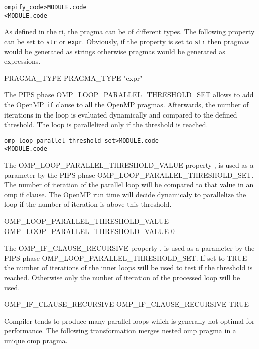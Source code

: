 \documentclass[a4paper]{report}
\newenvironment{PipsMake}{\begin{alltt}}{\end{alltt}}
\newenvironment{PipsPass}[1]{\label{pass:#1}}{}
\begin{document}
\begin{PipsMake}
ompify_code             > MODULE.code
        < MODULE.code

\end{PipsMake}

As defined in the ri, the pragma can be of different types. The following
property can be set to \verb|str| or \verb|expr|. Obviously, if the
property is set to \verb|str| then pragmas would be generated as strings
otherwise pragmas would be generated as expressions.
\begin{PipsProp}{PRAGMA_TYPE}
PRAGMA_TYPE "expr"
\end{PipsProp}

\begin{PipsPass}{omp_loop_parallel_threshold_set}
The PIPS phase  OMP\_LOOP\_PARALLEL\_THRESHOLD\_SET allows to add the OpenMP
\verb|if| clause to all the OpenMP pragmas. Afterwards, the number of iterations
in the loop is evaluated dynamically and compared to the defined threshold.
The loop is parallelized only if the threshold is reached.
\end{PipsPass}

\begin{PipsMake}
omp_loop_parallel_threshold_set             > MODULE.code
        < MODULE.code
\end{PipsMake}

The OMP\_LOOP\_PARALLEL\_THRESHOLD\_VALUE property , is used as a parameter by the
PIPS phase OMP\_LOOP\_PARALLEL\_THRESHOLD\_SET. The number of iteration of the
parallel loop will be compared to that value in an omp if clause. The OpenMP
run time will decide dynamicaly to parallelize the loop if the number of
iteration is above this threshold.
\begin{PipsProp}{OMP_LOOP_PARALLEL_THRESHOLD_VALUE}
OMP_LOOP_PARALLEL_THRESHOLD_VALUE 0
\end{PipsProp}

The OMP\_IF\_CLAUSE\_RECURSIVE property , is used as a parameter by the
PIPS phase OMP\_LOOP\_PARALLEL\_THRESHOLD\_SET. If set to TRUE the number
of iterations of the inner loops will be used to test if the threshold is
reached. Otherwise only the nunber of iteration of the processed loop will be
used.
\begin{PipsProp}{OMP_IF_CLAUSE_RECURSIVE}
OMP_IF_CLAUSE_RECURSIVE TRUE
\end{PipsProp}

\begin{PipsPass}{omp_merge_pragma}
  Compiler tends to produce many parallel loops which is generally not
  optimal for performance. The following transformation merges nested
  omp pragma in a unique omp pragma.
\end{PipsPass}
\end{document}
